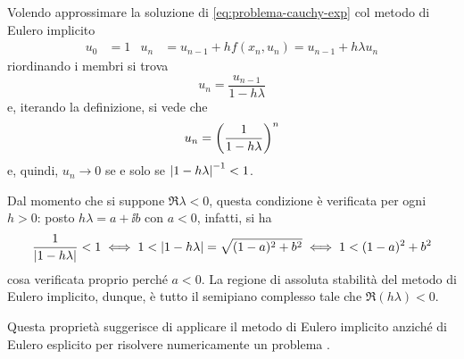 	\begin{esempio}
		Volendo approssimare la soluzione di \eqref{eq:problema-cauchy-exp} col metodo di Eulero implicito
		\begin{align*}
			u_0 &= 1 &
			u_n &= u_{n - 1} + h f (x_n, u_n) = u_{n - 1} + h \lambda u_n
		\end{align*}
		riordinando i membri si trova
		\begin{equation*}
			u_n = \frac{u_{n - 1}}{1 - h \lambda}
		\end{equation*}
		e, iterando la definizione, si vede che
		\begin{equation*}
			u_n = \qty(\frac{1}{1 - h \lambda})^n
		\end{equation*}
		e, quindi, \(u_n \to 0\) se e solo se \(\abs{1 - h \lambda}^{-1} < 1\).
		
		Dal momento che si suppone \(\Re \lambda < 0\), questa condizione è verificata per ogni \(h > 0\): posto \(h \lambda = a + \ii b\) con \(a < 0\), infatti, si ha
		\begin{equation*}
			\frac{1}{\abs{1 - h \lambda}} < 1 \iff 1 < \abs{1 - h \lambda} = \sqrt{(1 - a)^2 + b^2} \iff 1 < (1 - a)^2 + b^2
		\end{equation*}
		cosa verificata proprio perché \(a < 0\). La regione di assoluta stabilità del metodo di Eulero implicito, dunque, è tutto il semipiano complesso tale che \(\Re (h \lambda) < 0\).
		
		Questa proprietà suggerisce di applicare il metodo di Eulero implicito anziché di Eulero esplicito per risolvere numericamente un problema .
	\end{esempio}

